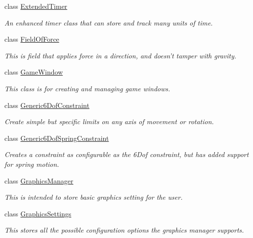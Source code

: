 \begin{DoxyCompactItemize}
class \hyperlink{classphys_1_1ExtendedTimer}{ExtendedTimer}
\begin{DoxyCompactList}\small\item\em An enhanced timer class that can store and track many units of time. \item\end{DoxyCompactList}\item 
class \hyperlink{classphys_1_1FieldOfForce}{FieldOfForce}
\begin{DoxyCompactList}\small\item\em This is field that applies force in a direction, and doesn't tamper with gravity. \item\end{DoxyCompactList}\item 
class \hyperlink{classphys_1_1GameWindow}{GameWindow}
\begin{DoxyCompactList}\small\item\em This class is for creating and managing game windows. \item\end{DoxyCompactList}\item 
class \hyperlink{classphys_1_1Generic6DofConstraint}{Generic6DofConstraint}
\begin{DoxyCompactList}\small\item\em Create simple but specific limits on any axis of movement or rotation. \item\end{DoxyCompactList}\item 
class \hyperlink{classphys_1_1Generic6DofSpringConstraint}{Generic6DofSpringConstraint}
\begin{DoxyCompactList}\small\item\em Creates a constraint as configurable as the 6Dof constraint, but has added support for spring motion. \item\end{DoxyCompactList}\item 
class \hyperlink{classphys_1_1GraphicsManager}{GraphicsManager}
\begin{DoxyCompactList}\small\item\em This is intended to store basic graphics setting for the user. \item\end{DoxyCompactList}\item 
class \hyperlink{structphys_1_1GraphicsSettings}{GraphicsSettings}
\begin{DoxyCompactList}\small\item\em This stores all the possible configuration options the graphics manager supports. \item\end{DoxyCompactList}\item 

\end{DoxyCompactItemize}
